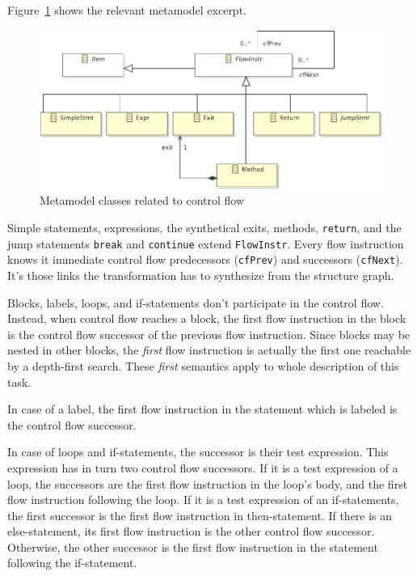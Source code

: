 \documentclass[11pt]{article}
\begin{document}
Figure~\ref{fig:control-flow-mm} shows the relevant metamodel excerpt.

\begin{figure}[h!]
  \centering
  \includegraphics[width=0.8\linewidth]{../metamodel/ControlFlowGraph}
  \caption{Metamodel classes related to control flow}
  \label{fig:control-flow-mm}
\end{figure}

Simple statements, expressions, the synthetical exits, methods, \verb|return|,
and the jump statements \verb|break| and \verb|continue| extend
\verb|FlowInstr|.  Every flow instruction knows it immediate control flow
predecessors (\verb|cfPrev|) and successors (\verb|cfNext|).  It's those links
the transformation has to synthesize from the structure graph.

Blocks, labels, loops, and if-statements don't participate in the control flow.
Instead, when control flow reaches a block, the first flow instruction in the
block is the control flow successor of the previous flow instruction.  Since
blocks may be nested in other blocks, the \emph{first} flow instruction is
actually the first one reachable by a depth-first search.  These \emph{first}
semantics apply to whole description of this task.

In case of a label, the first flow instruction in the statement which is
labeled is the control flow successor.

In case of loops and if-statements, the successor is their test expression.
This expression has in turn two control flow successors.  If it is a test
expression of a loop, the successors are the first flow instruction in the
loop's body, and the first flow instruction following the loop.  If it is a
test expression of an if-statements, the first successor is the first flow
instruction in then-statement.  If there is an else-statement, its first flow
instruction is the other control flow successor.  Otherwise, the other
successor is the first flow instruction in the statement following the
if-statement.
\end{document}

